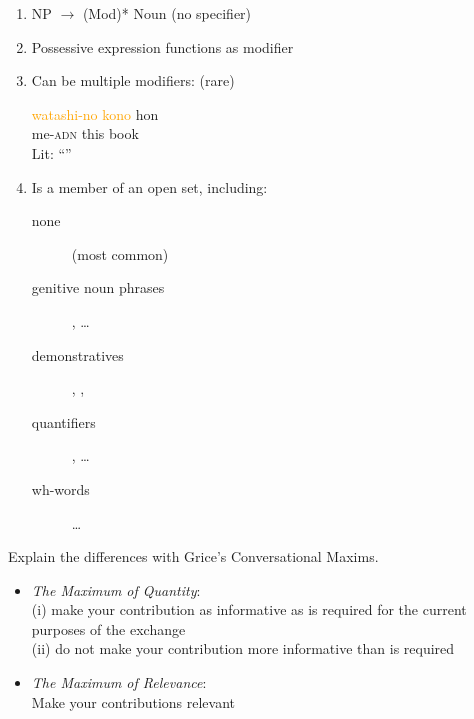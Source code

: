 \documentclass[a4paper,landscape,headrule,footrule,xetex]{foils}
\newcommand{\exl}[1]{\textcolor{orange}{#1}}
\begin{document}
\begin{enumerate}\addtolength{\itemsep}{-5mm}
\item NP $\rightarrow$ (Mod)*  Noun \hfill (no specifier)
\item Possessive expression functions as modifier
\item Can be multiple modifiers: (rare) 
 \begin{exe}
    \ex \gll \exl{watashi-no} \exl{kono} hon \\
   me-\textsc{adn} this book \\
    \trans Lit: ``\eng{\exl{my} \exl{this} book}''
  \end{exe}
\item Is a member of an open set, including:
  \begin{description}
  \item[none]  (most common)
  \item[genitive noun phrases],
     \dots
  \item[demonstratives] , , 
  \item[quantifiers] ,  \ldots
  \item[wh-words]  \dots
  \end{description}
\end{enumerate}



Explain the differences with Grice's Conversational Maxims.

\begin{itemize}\addtolength{\itemsep}{-5mm}
  \item \textit{The Maximum of Quantity}:\\
    (i) make your contribution as informative as is required for
    the current purposes of the exchange \\
 (ii) do not make your contribution more informative than is
    required   
  \item \textit{The Maximum of Relevance}:\\
      Make your contributions relevant
\end{itemize}
\end{document}
